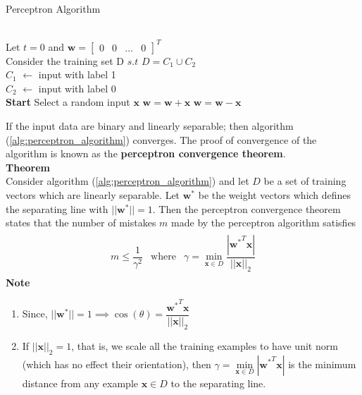 \begin{algorithm}[H]
\caption{Perceptron Algorithm}\label{alg:perceptron_algorithm}
\begin{algorithmic}[1]
\Require \\
Let $t=0$ and $\textbf{w} = \begin{bmatrix}
  0 & 0 & \dots & 0
\end{bmatrix}^T$ \\
Consider the training set D $s.t$ $D = C_1 \cup C_2$  \\
$C_1$ $\leftarrow$ input with label 1 \\
$C_2$ $\leftarrow$ input with label 0\\
\textbf{Start}
  \State Select a random input $\textbf{x}$
  \State $\textbf{w} = \textbf{w} + \textbf{x}$
  \EndIf
  \State $\textbf{w} = \textbf{w} - \textbf{x}$
  \EndIf
\EndWhile
\end{algorithmic}
\end{algorithm}
\noindent If the input data are binary and linearly separable; then algorithm (\ref{alg:perceptron_algorithm}) converges. The proof of convergence of the algorithm is known as the \textbf{perceptron convergence theorem}.\\
\textbf{Theorem}\\
Consider algorithm (\ref{alg:perceptron_algorithm}) and let $D$ be a set of training vectors which are linearly separable. Let $\textbf{w}^{*}$ be the weight vectors which defines the separating line with $||\textbf{w}^{*}|| = 1$. Then the perceptron convergence theorem states that the number of mistakes $m$ made by the perceptron algorithm satisfies 
\begin{align}
  \begin{matrix}
    m \leq \dfrac{1}{\gamma^2} & \text{where} & \gamma = \underset{\textbf{x}\in D}{\min} \dfrac{|{\textbf{w}^*}^T\textbf{x}|}{||\textbf{x}||_2}
  \end{matrix}
\end{align}
\textbf{Note}
\begin{enumerate}
  \item Since, $||\textbf{w}^{*}|| = 1 \implies \cos (\theta) = \dfrac{{\textbf{w}^*}^T\textbf{x}}{||\textbf{x}||_2}$
  \item If $||\textbf{x}||_2 = 1$, that is, we scale all the training examples to have unit norm (which has no effect their orientation), then $\gamma = \underset{\textbf{x}\in D}{\min} |{\textbf{w}^*}^T\textbf{x}|$ is the minimum distance from any example $\textbf{x} \in D$ to the separating line.
\end{enumerate}
